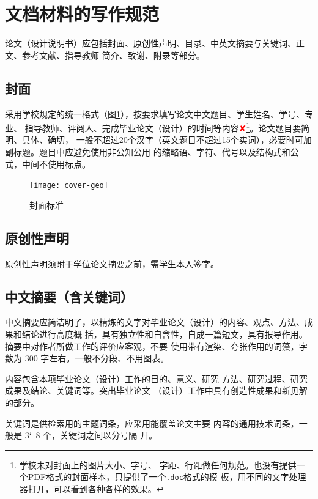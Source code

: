 \documentclass{swfuthesis}
\begin{document}
\section{文档材料的写作规范}

论文（设计说明书）应包括封面、原创性声明、目录、中英文摘要与关键词、正文、参考文献、指导教师
简介、致谢、附录等部分。

\subsection{封面}

采用学校规定的统一格式（图\ref{fig:cover}），按要求填写论文中文题目、学生姓名、学号、专业、
指导教师、评阅人、完成毕业论文（设计）的时间等内容{\textcolor{red}{✘}}\footnote{学校未对封面上的图片大小、字号、
  字距、行距做任何规范。也没有提供一个PDF格式的封面样本，只提供了一个\texttt{.doc}格式的模
  板，用不同的文字处理器打开，可以看到各种各样的效果。}。论文题目要简明、具体、确切，
一般不超过20个汉字（英文题目不超过15个实词），必要时可加副标题。题目中应避免使用非公知公用
的缩略语、字符、代号以及结构式和公式，中间不使用标点。

\begin{figure}
  \centering
  \texttt{[image: cover-geo]}
  \caption{封面标准\label{fig:cover}}  
\end{figure}

\subsection{原创性声明}

原创性声明须附于学位论文摘要之前，需学生本人签字。

\subsection{中文摘要（含关键词）}

中文摘要应简洁明了，以精炼的文字对毕业论文（设计）的内容、观点、方法、成果和结论进行高度概
括，具有独立性和自含性，自成一篇短文，具有报导作用。摘要中对作者所做工作的评价应客观，不要
使用带有渲染、夸张作用的词藻，字数为 300 字左右。一般不分段、不用图表。

内容包含本项毕业论文（设计）工作的目的、意义、研究
方法、研究过程、研究成果及结论、关键词等。突出毕业论文
（设计）工作中具有创造性成果和新见解的部分。

关键词是供检索用的主题词条，应采用能覆盖论文主要
内容的通用技术词条，一般是 3\char`~8 个，关键词之间以分号隔
开。
\end{document}
